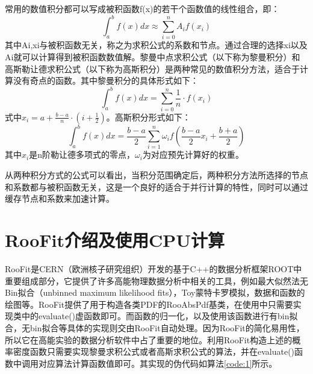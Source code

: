 常用的数值积分都可以写成被积函数f(x)的若干个函数值的线性组合，即：
\begin{equation}
    \int_a^bf(x)dx\approx\sum_{i=0}^n A_i f(x_i)
\end{equation}
其中Ai,xi与被积函数无关，称之为求积公式的系数和节点\supercite{jisuanfangfa}。通过合理的选择xi以及Ai就可以计算得到被积函数数值解。黎曼中点求积公式（以下称为黎曼积分）和高斯勒让德求积公式（以下称为高斯积分）是两种常见的数值积分方法\supercite{jisuanfangfa}，适合于计算没有奇点的函数。其中黎曼积分的具体形式如下：
\begin{equation}
    \int_a^bf(x)dx = \sum_{i=0}^n \frac{1}{n}\cdot f(x_i)
\end{equation}
式中$x_i=a+\frac{b-a}{n}\cdot(i+\frac{1}{2})$。高斯积分形式如下：
\begin{equation}
\int_a^bf(x)dx=\frac{b-a}{2}\sum_{i=1}^n\omega_if(\frac{b-a}{2}x_i+\frac{b+a}{2})
\end{equation}
其中$x_i$是n阶勒让德多项式的零点，$\omega_i$为对应预先计算好的权重\supercite{jisuanfangfa}\supercite{bogaert2014iteration}。

从两种积分方式的公式可以看出，当积分范围确定后，两种积分方法所选择的节点和系数都与被积函数无关，这是一个良好的适合于并行计算的特性，同时可以通过缓存节点和系数来加速计算。

\section{RooFit介绍及使用CPU计算}

RooFit是CERN（欧洲核子研究组织）开发的基于C++的数据分析框架ROOT中重要组成部分\supercite{roofit}\supercite{root}，它提供了许多高能物理数据分析中相关的工具，例如最大似然法无Bin拟合（unbinned maximum likelihood fits），Toy蒙特卡罗模拟，数据和函数的绘图等。RooFit提供了用于构造各类PDF的RooAbsPdf基类，在使用中只需要实现类中的evaluate()虚函数即可。而函数的归一化，以及使用该函数进行有bin拟合，无bin拟合等具体的实现则交由RooFit自动处理。因为RooFit的简化易用性，所以它在高能实验的数据分析软件中占了重要的地位。利用RooFit构造上述的概率密度函数只需要实现黎曼求积公式或者高斯求积公式的算法，并在evaluate()函数中调用对应算法计算函数值即可。其实现的伪代码如算法\ref{code:1}所示。

